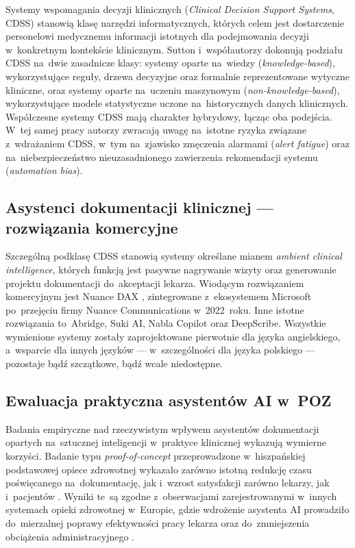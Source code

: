 Systemy wspomagania decyzji klinicznych (\emph{Clinical Decision
Support Systems}, CDSS) stanowią klasę narzędzi informatycznych,
których celem jest dostarczenie personelowi medycznemu informacji
istotnych dla podejmowania decyzji w~konkretnym kontekście klinicznym.
Sutton i~współautorzy \parencite{sutton2020cdss} dokonują podziału
CDSS na~dwie zasadnicze klasy: systemy oparte na~wiedzy
(\emph{knowledge-based}), wykorzystujące reguły, drzewa decyzyjne
oraz formalnie reprezentowane wytyczne kliniczne, oraz systemy oparte
na~uczeniu maszynowym (\emph{non-knowledge-based}), wykorzystujące
modele statystyczne uczone na~historycznych danych klinicznych.
Współczesne systemy CDSS mają charakter hybrydowy, łącząc oba
podejścia. W~tej samej pracy autorzy zwracają uwagę na~istotne
ryzyka związane z~wdrażaniem CDSS, w~tym na~zjawisko zmęczenia
alarmami (\emph{alert fatigue}) oraz na~niebezpieczeństwo
nieuzasadnionego zawierzenia rekomendacji systemu (\emph{automation
bias}).

\subsection{Asystenci dokumentacji klinicznej --- rozwiązania komercyjne}

Szczególną podklasę CDSS stanowią systemy określane mianem
\emph{ambient clinical intelligence}, których funkcją jest pasywne
nagrywanie wizyty oraz generowanie projektu dokumentacji do~akceptacji
lekarza. Wiodącym rozwiązaniem komercyjnym jest Nuance DAX
\parencite{nuancedax2024}, zintegrowane z~ekosystemem Microsoft po~przejęciu
firmy Nuance Communications w~2022~roku. Inne istotne rozwiązania
to~Abridge, Suki AI, Nabla Copilot oraz DeepScribe. Wszystkie
wymienione systemy zostały zaprojektowane pierwotnie dla języka
angielskiego, a~wsparcie dla innych języków --- w~szczególności
dla języka polskiego --- pozostaje bądź szczątkowe, bądź wcale
niedostępne.

\subsection{Ewaluacja praktyczna asystentów AI w~POZ}

Badania empiryczne nad rzeczywistym wpływem asystentów dokumentacji
opartych na~sztucznej inteligencji w~praktyce klinicznej wykazują
wymierne korzyści. Badanie typu \emph{proof-of-concept} przeprowadzone
w~hiszpańskiej podstawowej opiece zdrowotnej wykazało zarówno
istotną redukcję czasu poświęcanego na~dokumentację, jak
i~wzrost satysfakcji zarówno lekarzy, jak i~pacjentów
\parencite{jmiraispanishscribe}. Wyniki te~są zgodne
z~obserwacjami zarejestrowanymi w~innych systemach opieki zdrowotnej
w~Europie, gdzie wdrożenie asystenta AI prowadziło do~mierzalnej
poprawy efektywności pracy lekarza oraz do~zmniejszenia obciążenia
administracyjnego \parencite{aiscribeurope}.

